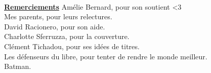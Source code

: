 \begin{titlepage}
~\vfill
\begin{center}
\begin{minipage}[c]{15cm}
	\begin{center}
	{\large \textbf{\underline{Remerciements}}}
	\linebreak
	\linebreak
	Amélie Bernard, pour son soutient <3\\
	Mes parents, pour leurs relectures.\\
	David Racionero, pour son aide.\\
	Charlotte Sferruzza, pour la couverture.\\
	Clément Tichadou, pour ses idées de titres.\\
	Les défenseurs du libre, pour tenter de rendre le monde meilleur.\\
	Batman.
	\end{center}
\end{minipage}

\vspace{240pt}


\end{center}
\end{titlepage}
